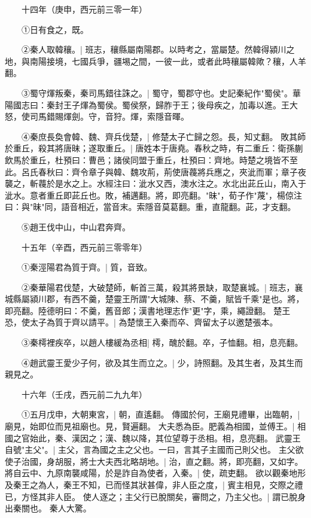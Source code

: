 　　十四年（庚申，西元前三零一年）

　　①日有食之，既。

　　②秦人取韓穰。|{
	班志，穰縣屬南陽郡。以時考之，當屬楚。然韓得潁川之地，與南陽接境，七國兵爭，疆埸之間，一彼一此，或者此時穰屬韓歟？穰，人羊翻。
	}

　　③蜀守煇叛秦，秦司馬錯往誅之。|{
	蜀守，蜀郡守也。史記秦紀作"蜀侯"。華陽國志曰：秦封王子煇為蜀侯。蜀侯祭，歸胙于王；後母疾之，加毒以進。王大怒，使司馬錯賜煇劍。守，音狩。煇，索隱音暉。
	}

　　④秦庶長奐會韓、魏、齊兵伐楚，|{
	修楚太子亡歸之怨。長，知丈翻。
	}
敗其師於重丘，殺其將唐昧；遂取重丘。|{
	唐姓本于唐堯。春秋之時，有二重丘：衛孫蒯飲馬於重丘，杜預曰：曹邑；諸侯同盟于重丘，杜預曰：齊地。時楚之境皆不至此。呂氏春秋曰：齊令章子與韓、魏攻荊，荊使唐薎將兵應之，夾泚而軍；章子夜襲之，斬薎於是水之上。水經注曰：泚水又西，澳水注之。水北出茈丘山，南入于泚水。意者重丘即茈丘也。敗，補邁翻。將，即亮翻。"昧"，荀子作"蔑"，楊倞注曰：與"昧"同，語音相近，當音末。索隱音莫葛翻。重，直龍翻。茈，才支翻。
	}

　　⑤趙王伐中山，中山君奔齊。

　　十五年（辛酉，西元前三零零年）

　　①秦涇陽君為質于齊。|{
	質，音致。
	}

　　②秦華陽君伐楚，大破楚師，斬首三萬，殺其將景缺，取楚襄城。|{
	班志，襄城縣屬潁川郡，有西不羹，楚靈王所謂"大城陳、蔡、不羹，賦皆千乘"是也。將，即亮翻。陸德明曰：不羹，舊音郎；漢書地理志作"更"字，乘，繩證翻。
	}
楚王恐，使太子為質于齊以請平。|{
	為楚懷王入秦而卒、齊留太子以邀楚張本。
	}

　　③秦樗裡疾卒，以趙人樓緩為丞相|{
	樗，醜於翻。卒，子恤翻。相，息亮翻。
	}

　　④趙武靈王愛少子何，欲及其生而立之。|{
	少，詩照翻。及其生者，及其生而親見之。
	}

　　十六年（壬戌，西元前二九九年）

　　①五月戊申，大朝東宮，|{
	朝，直遙翻。
	}
傳國於何，王廟見禮畢，出臨朝，|{
	廟見，始即位而見祖廟也。見，賢遍翻。
	}
大夫悉為臣。肥義為相國，並傅王。|{
	相國之官始此，秦、漢因之；漢、魏以降，其位望尊于丞相。相，息亮翻。
	}
武靈王自號"主父"。|{
	主父，言為國之主之父也。一曰，言其子主國而己則父也。
	}
主父欲使子治國，身胡服，將士大夫西北略胡地。|{
	治，直之翻。將，即亮翻，又如字。
	}
將自云中、九原南襲咸陽，於是詐自為使者，入秦。|{
	使，疏吏翻。
	}
欲以觀秦地形及秦王之為人，秦王不知，已而怪其狀甚偉，非人臣之度，|{
	賓主相見，交際之禮已，方怪其非人臣。
	}
使人逐之；主父行已脫關矣，審問之，乃主父也。|{
	謂已脫身出秦關也。
	}
秦人大驚。

